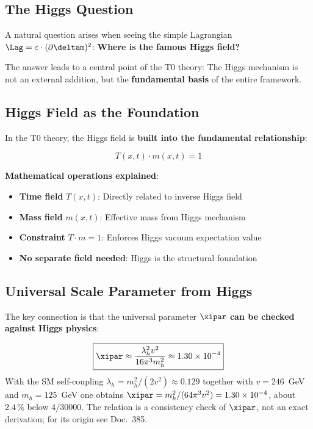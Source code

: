 	\subsection{The Higgs Question}
	
	A natural question arises when seeing the simple Lagrangian $\Lag = \varepsilon \cdot (\partial \deltam)^2$: \textbf{Where is the famous Higgs field?}
	
	The answer leads to a central point of the T0 theory: The Higgs mechanism is not an external addition, but the \textbf{fundamental basis} of the entire framework.
	
	\subsection{Higgs Field as the Foundation}
	
	In the T0 theory, the Higgs field is \textbf{built into the fundamental relationship}:
	
	\begin{equation}
		\boxed{T(x,t) \cdot m(x,t) = 1}
		\label{eq:higgs_foundation}
	\end{equation}
	
	\textbf{Mathematical operations explained}:
	\begin{itemize}
		\item \textbf{Time field} $T(x,t)$: Directly related to inverse Higgs field
		\item \textbf{Mass field} $m(x,t)$: Effective mass from Higgs mechanism
		\item \textbf{Constraint} $T \cdot m = 1$: Enforces Higgs vacuum expectation value
		\item \textbf{No separate field needed}: Higgs is the structural foundation
	\end{itemize}
	
	\subsection{Universal Scale Parameter from Higgs}
	
	The key connection is that the universal parameter $\xipar$ \textbf{can be checked against Higgs physics}:
	
	\begin{equation}
		\boxed{\xipar \approx \frac{\lambda_h^2 v^2}{16\pi^3 m_h^2} \approx 1.30 \times 10^{-4}}
		\label{eq:xi_from_higgs}
	\end{equation}
	With the SM self-coupling $\lambda_h = m_h^2/(2v^2) \approx 0.129$ together with $v = 246$~GeV and $m_h = 125$~GeV one obtains $\xipar = m_h^2/(64\pi^3 v^2) = 1.30 \times 10^{-4}$, about $2.4\,\%$ below $4/30000$. The relation is a consistency check of $\xipar$, not an exact derivation; for its origin see Doc.~385.
	
